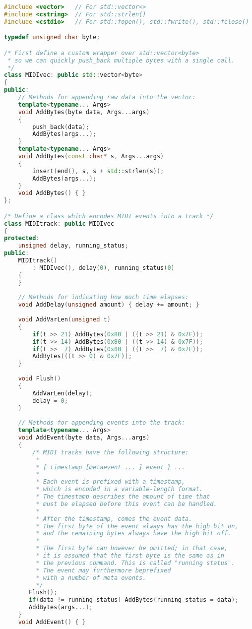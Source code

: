 \documentclass[a4paper]{report}
\begin{document}
\begin{lstlisting}[language=C++, caption=CPP MIDI,captionpos=b]
#include <vector>   // For std::vector<>
#include <cstring>  // For std::strlen()
#include <cstdio>   // For std::fopen(), std::fwrite(), std::fclose()

typedef unsigned char byte;

/* First define a custom wrapper over std::vector<byte>
 * so we can quickly push_back multiple bytes with a single call.
 */
class MIDIvec: public std::vector<byte>
{
public:
    // Methods for appending raw data into the vector:
    template<typename... Args>
    void AddBytes(byte data, Args...args)
    {
        push_back(data);
        AddBytes(args...);
    }
    template<typename... Args>
    void AddBytes(const char* s, Args...args)
    {
        insert(end(), s, s + std::strlen(s));
        AddBytes(args...);
    }
    void AddBytes() { }
};

/* Define a class which encodes MIDI events into a track */
class MIDItrack: public MIDIvec
{
protected:
    unsigned delay, running_status;
public:
    MIDItrack()
        : MIDIvec(), delay(0), running_status(0)
    {
    }
    
    // Methods for indicating how much time elapses:
    void AddDelay(unsigned amount) { delay += amount; }
    
    void AddVarLen(unsigned t)
    {
        if(t >> 21) AddBytes(0x80 | ((t >> 21) & 0x7F));
        if(t >> 14) AddBytes(0x80 | ((t >> 14) & 0x7F));
        if(t >>  7) AddBytes(0x80 | ((t >>  7) & 0x7F));
        AddBytes(((t >> 0) & 0x7F));
    }
    
    void Flush()
    {
        AddVarLen(delay);
        delay = 0;
    }
    
    // Methods for appending events into the track:
    template<typename... Args>
    void AddEvent(byte data, Args...args)
    {
        /* MIDI tracks have the following structure:
         *
         * { timestamp [metaevent ... ] event } ...
         *
         * Each event is prefixed with a timestamp,
         * which is encoded in a variable-length format.
         * The timestamp describes the amount of time that
         * must be elapsed before this event can be handled.
         *
         * After the timestamp, comes the event data.
         * The first byte of the event always has the high bit on,
         * and the remaining bytes always have the high bit off.
         *
         * The first byte can however be omitted; in that case,
         * it is assumed that the first byte is the same as in
         * the previous command. This is called "running status".
         * The event may furthermore beprefixed
         * with a number of meta events.
         */
       Flush();
       if(data != running_status) AddBytes(running_status = data);
       AddBytes(args...);
    }
    void AddEvent() { }
    

\end{lstlisting}
\end{document}
